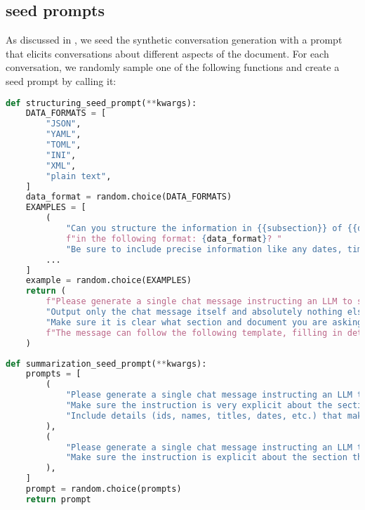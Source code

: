 \subsection{\method seed prompts}
\label{app:method-data-seed}
As discussed in , we seed the synthetic conversation generation with a prompt that elicits conversations about different aspects of the document.
For each conversation, we randomly sample one of the following functions and create a seed prompt by calling it:
\begin{exampleboxcode}
    \tiny
\begin{lstlisting}[language=Python]
def structuring_seed_prompt(**kwargs):
    DATA_FORMATS = [
        "JSON",
        "YAML",
        "TOML",
        "INI",
        "XML",
        "plain text",
    ]
    data_format = random.choice(DATA_FORMATS)
    EXAMPLES = [
        (
            "Can you structure the information in {{subsection}} of {{document}} related to {{something specific}} "
            f"in the following format: {data_format}? "
            "Be sure to include precise information like any dates, times, names, and numerical values.'"
        ...
    ]
    example = random.choice(EXAMPLES)
    return (
        f"Please generate a single chat message instructing an LLM to structure the information in {data_format}. "
        "Output only the chat message itself and absolutely nothing else. "
        "Make sure it is clear what section and document you are asking about. "
        f"The message can follow the following template, filling in details from the corpus: \n\n'{example}'"
    )
    \end{lstlisting}
\end{exampleboxcode}
\begin{exampleboxcode}
\begin{lstlisting}[language=Python]
def summarization_seed_prompt(**kwargs):
    prompts = [
        (
            "Please generate a single chat message instructing an LLM to summarize part of the corpus. "
            "Make sure the instruction is very explicit about the section of the corpus that you want to summarize. "
            "Include details (ids, names, titles, dates, etc.) that make it clear what you are asking about. "
        ),
        (
            "Please generate a single chat message instructing an LLM to summarize a section. "
            "Make sure the instruction is explicit about the section that should be summarized and the document it is from."
        ),
    ]
    prompt = random.choice(prompts)
    return prompt
    \end{lstlisting}
\end{exampleboxcode}
